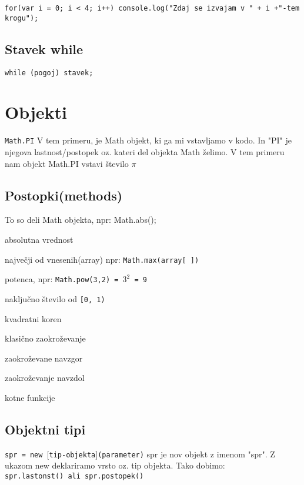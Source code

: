 \begin{verbatim}
for(var i = 0; i < 4; i++) console.log("Zdaj se izvajam v " + i +"-tem krogu");
\end{verbatim}

\subsection{Stavek while}

\texttt{while (pogoj) stavek;}
\newpage

\section{Objekti}

\texttt{Math.PI}
V tem primeru, je Math objekt, ki ga mi vstavljamo v kodo. In "PI" je njegova lastnost/postopek oz. kateri del objekta Math želimo. V tem primeru nam objekt Math.PI vstavi število $\pi$

\subsection{Postopki(methods)}
To so deli Math objekta, npr: Math.abs();
\begin{description}[align=left, labelwidth=2cm]
	\item[abs()] absolutna vrednost
	\item[max()] največji od vnesenih(array) npr: \texttt{Math.max(array[ ])}
	\item[pow()] potenca, npr: \texttt{Math.pow(3,2) = $3^2$ = 9}
	
	\item[random()] naključno število od \texttt{[0, 1)}
	\item[sqrt()] kvadratni koren
	\item[round()] klasično zaokroževanje
	\item[ceil()] zaokroževane navzgor
	\item[floor()] zaokroževanje navzdol
	\item[sin(), cos(), tan()] kotne funkcije
\end{description}

\subsection{Objektni tipi}

\texttt{spr = new $[$tip-objekta$]$(parameter)}
spr je nov objekt z imenom "spr". Z ukazom new deklariramo vrsto oz. tip objekta. Tako dobimo:\\
\texttt{spr.lastonst() ali spr.postopek()}

